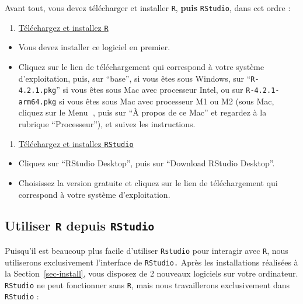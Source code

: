 \documentclass[
  a4paper,
  DIV=11,
  numbers=noendperiod,
  oneside]{scrreprt}
\providecommand{\tightlist}{%
  \setlength{\itemsep}{0pt}\setlength{\parskip}{0pt}}\usepackage{longtable,booktabs,array}
\begin{document}
Avant tout, vous devez télécharger et installer \texttt{R},
\textbf{puis} \texttt{RStudio}, dans cet ordre :

\begin{enumerate}
\def\labelenumi{\arabic{enumi}.}
\tightlist
\item
  \href{https://cran.r-project.org}{Téléchargez et installez \texttt{R}}
\end{enumerate}

\begin{itemize}
\tightlist
\item
  Vous devez installer ce logiciel en premier.
\item
  Cliquez sur le lien de téléchargement qui correspond à votre système
  d'exploitation, puis, sur ``base'', si vous êtes sous Windows, sur
  ``\texttt{R-4.2.1.pkg}'' si vous êtes sous Mac avec processeur Intel,
  ou sur \texttt{R-4.2.1-arm64.pkg} si vous êtes sous Mac avec
  processeur M1 ou M2 (sous Mac, cliquez sur le Menu , puis sur ``À
  propos de ce Mac'' et regardez à la rubrique ``Processeur''), et
  suivez les instructions.
\end{itemize}

\begin{enumerate}
\def\labelenumi{\arabic{enumi}.}
\setcounter{enumi}{1}
\tightlist
\item
  \href{https://www.rstudio.com/products/RStudio/\#Desktop}{Téléchargez
  et installez \texttt{RStudio}}
\end{enumerate}

\begin{itemize}
\tightlist
\item
  Cliquez sur ``RStudio Desktop'', puis sur ``Download RStudio
  Desktop''.
\item
  Choisissez la version gratuite et cliquez sur le lien de
  téléchargement qui correspond à votre système d'exploitation.
\end{itemize}

\subsection{\texorpdfstring{Utiliser \texttt{R} depuis
\texttt{RStudio}}{Utiliser R depuis RStudio}}\label{utiliser-r-depuis-rstudio}

Puisqu'il est beaucoup plus facile d'utiliser \texttt{Rstudio} pour
interagir avec \texttt{R}, nous utiliserons exclusivement l'interface de
\texttt{RStudio.} Après les installations réalisées à la
Section~\ref{sec-install}, vous disposez de 2 nouveaux logiciels sur
votre ordinateur. \texttt{RStudio} ne peut fonctionner sans \texttt{R},
mais nous travaillerons exclusivement dans \texttt{RStudio} :
\end{document}
